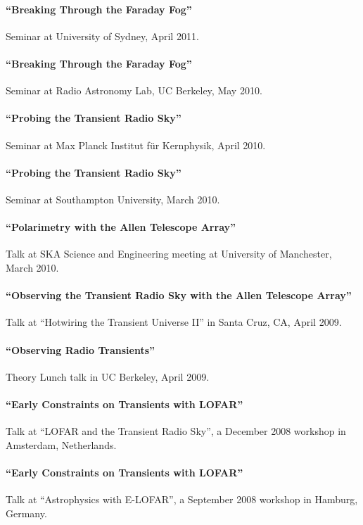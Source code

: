 \documentclass[12pt]{article}
\begin{document}
\paragraph{``Breaking Through the Faraday Fog''} Seminar at University of Sydney, April 2011.

\paragraph{``Breaking Through the Faraday Fog''} Seminar at Radio Astronomy Lab, UC Berkeley, May 2010.

\paragraph{``Probing the Transient Radio Sky''} Seminar at Max Planck Institut f\"ur Kernphysik, April 2010.

\paragraph{``Probing the Transient Radio Sky''} Seminar at Southampton University, March 2010.

\paragraph{``Polarimetry with the Allen Telescope Array''} Talk at SKA Science and Engineering meeting at University of Manchester, March 2010.

\paragraph{``Observing the Transient Radio Sky with the Allen Telescope Array''} Talk at ``Hotwiring the Transient Universe II'' in Santa Cruz, CA, April 2009.

\paragraph{``Observing Radio Transients''} Theory Lunch talk in UC Berkeley, April 2009.

\paragraph{``Early Constraints on Transients with LOFAR''} Talk at ``LOFAR and the Transient Radio Sky'', a December 2008 workshop in Amsterdam, Netherlands.

\paragraph{``Early Constraints on Transients with LOFAR''} Talk at ``Astrophysics with E-LOFAR'', a September 2008 workshop in Hamburg, Germany.
\end{document}
